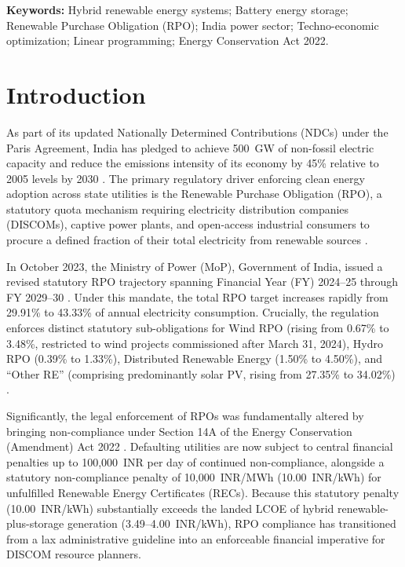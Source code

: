 \documentclass[11pt,a4paper]{article}
\begin{document}
\begin{abstract}
cost-optimal storage duration. Financial mechanics analysis under Section 14A confirms that green PPA procurement is 2.4 to 2.88$\times$ cheaper than statutory REC non-compliance penalties (10.00~INR/kWh), providing DISCOM resource planners with an auditable, bankable roadmap for clean energy transition.
\end{abstract}

\textbf{Keywords:} Hybrid renewable energy systems; Battery energy storage; Renewable Purchase Obligation (RPO); India power sector; Techno-economic optimization; Linear programming; Energy Conservation Act 2022.

\section{Introduction}
\label{sec:intro}

As part of its updated Nationally Determined Contributions (NDCs) under the Paris Agreement, India has pledged to achieve 500~GW of non-fossil electric capacity and reduce the emissions intensity of its economy by 45\% relative to 2005 levels by 2030 \cite{Singh2024}. The primary regulatory driver enforcing clean energy adoption across state utilities is the Renewable Purchase Obligation (RPO), a statutory quota mechanism requiring electricity distribution companies (DISCOMs), captive power plants, and open-access industrial consumers to procure a defined fraction of their total electricity from renewable sources \cite{Prateek2019, Singh2024}.

In October 2023, the Ministry of Power (MoP), Government of India, issued a revised statutory RPO trajectory spanning Financial Year (FY) 2024--25 through FY 2029--30 \cite{CEA2023, Singh2024}. Under this mandate, the total RPO target increases rapidly from 29.91\% to 43.33\% of annual electricity consumption. Crucially, the regulation enforces distinct statutory sub-obligations for Wind RPO (rising from 0.67\% to 3.48\%, restricted to wind projects commissioned after March 31, 2024), Hydro RPO (0.39\% to 1.33\%), Distributed Renewable Energy (1.50\% to 4.50\%), and ``Other RE'' (comprising predominantly solar PV, rising from 27.35\% to 34.02\%) \cite{Takyar2024}.

Significantly, the legal enforcement of RPOs was fundamentally altered by bringing non-compliance under Section 14A of the Energy Conservation (Amendment) Act 2022 \cite{Singh2024, Outlook2024}. Defaulting utilities are now subject to central financial penalties up to 100,000~INR per day of continued non-compliance, alongside a statutory non-compliance penalty of 10,000~INR/MWh (10.00~INR/kWh) for unfulfilled Renewable Energy Certificates (RECs). Because this statutory penalty (10.00~INR/kWh) substantially exceeds the landed LCOE of hybrid renewable-plus-storage generation (3.49--4.00~INR/kWh), RPO compliance has transitioned from a lax administrative guideline into an enforceable financial imperative for DISCOM resource planners.
\end{document}
